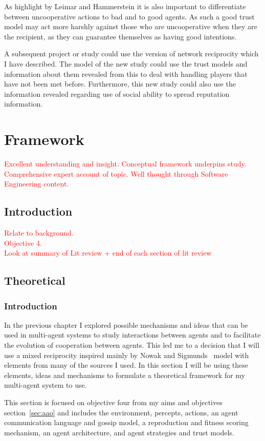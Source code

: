 \documentclass[]{final_report}
\begin{document}
As highlight by Leimar and Hammerstein it is also important to differentiate between uncooperative actions to bad and to good agents. As such a good trust model may act more harshly against those who are uncooperative when they are the recipient, as they can guarantee themselves as having good intentions.\par 
A subsequent project or study could use the version of network reciprocity which I have described. The model of the new study could use the trust models and information about them revealed from this to deal with handling players that have not been met before. Furthermore, this new study could also use the information revealed regarding use of social ability to spread reputation information.

\chapter{Framework}
\textcolor{red}{Excellent understanding and insight. Conceptual framework underpins study. Comprehensive expert account of topic. Well thought through Software Engineering content.}
\section{Introduction}
\textcolor{red}{Relate to background.\\
Objective 4.\\
Look at summary of Lit review + end of each section of lit review}

\section{Theoretical}
\subsection{Introduction}
In the previous chapter I explored possible mechanisms and ideas that can be used in multi-agent systems to study interactions between agents and to facilitate the evolution of cooperation between agents. This led me to a decision that I will use a mixed reciprocity inspired mainly by Nowak and Sigmunds~\cite{evol_indirect_image} model with elements from many of the sources I used. In this section I will be using these elements, ideas and mechanisms to formulate a theoretical framework for my multi-agent system to use.\par
This section is focused on objective four from my aims and objectives section~\ref{sec:aao} and includes the environment, percepts, actions, an agent communication language and gossip model, a reproduction and fitness scoring mechanism, an agent architecture, and agent strategies and trust models.
\end{document}
